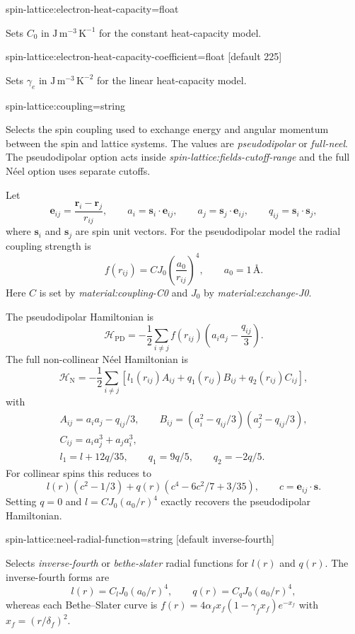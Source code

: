 {\zicf spin-lattice:electron-heat-capacity=float}
Sets $C_0$ in $\mathrm{J\,m^{-3}\,K^{-1}}$ for the constant heat-capacity model.

{\zicf spin-lattice:electron-heat-capacity-coefficient=float [default 225]}
Sets $\gamma_e$ in $\mathrm{J\,m^{-3}\,K^{-2}}$ for the linear heat-capacity model.

{\zicf spin-lattice:coupling=string}
Selects the spin coupling used to exchange energy and angular momentum between the spin and lattice systems. 
The values are \textit{pseudodipolar} or \textit{full-neel}. 
The pseudodipolar option acts inside \textit{spin-lattice:fields-cutoff-range} and the full N\'eel option uses separate cutoffs.

Let
\[
\mathbf{e}_{ij}=\frac{\mathbf{r}_i-\mathbf{r}_j}{r_{ij}},\qquad
a_i=\mathbf{s}_i\cdot\mathbf{e}_{ij},\qquad
a_j=\mathbf{s}_j\cdot\mathbf{e}_{ij},\qquad
q_{ij}=\mathbf{s}_i\cdot\mathbf{s}_j ,
\]
where $\mathbf{s}_i$ and $\mathbf{s}_j$ are spin unit vectors. For the pseudodipolar model the radial coupling strength is
\[
f(r_{ij})=C J_0\left(\frac{a_0}{r_{ij}}\right)^4,\qquad a_0=1\,\text{\AA}.
\]
Here $C$ is set by \textit{material:coupling-C0} and $J_0$ by \textit{material:exchange-J0}.

The pseudodipolar Hamiltonian is
\[
\mathcal{H}_{\mathrm{PD}}=-\frac{1}{2}\sum_{i\ne j}f(r_{ij})
\left(a_i a_j-\frac{q_{ij}}{3}\right).
\]
The full non-collinear N\'eel Hamiltonian is
\[
\mathcal{H}_{\mathrm{N}}=-\frac{1}{2}\sum_{i\ne j}
\left[l_1(r_{ij})A_{ij}+q_1(r_{ij})B_{ij}+q_2(r_{ij})C_{ij}\right],
\]
with
\[
\begin{gathered}
A_{ij}=a_i a_j-q_{ij}/3,\qquad
B_{ij}=(a_i^2-q_{ij}/3)(a_j^2-q_{ij}/3),\\
C_{ij}=a_i a_j^3+a_j a_i^3,\\
l_1=l+12q/35,\qquad q_1=9q/5,\qquad q_2=-2q/5.
\end{gathered}
\]
For collinear spins this reduces to
\[
l(r)(c^2-1/3)+q(r)(c^4-6c^2/7+3/35),\qquad c=\mathbf e_{ij}\cdot\mathbf s.
\]
Setting $q=0$ and $l=CJ_0(a_0/r)^4$ exactly recovers the pseudodipolar Hamiltonian.

{\zicf spin-lattice:neel-radial-function=string [default inverse-fourth]}
Selects \textit{inverse-fourth} or \textit{bethe-slater} radial functions for $l(r)$ and $q(r)$. The inverse-fourth forms are
\[
l(r)=C_lJ_0(a_0/r)^4,\qquad q(r)=C_qJ_0(a_0/r)^4,
\]
whereas each Bethe--Slater curve is $f(r)=4\alpha_f x_f(1-\gamma_f x_f)e^{-x_f}$ with $x_f=(r/\delta_f)^2$.

